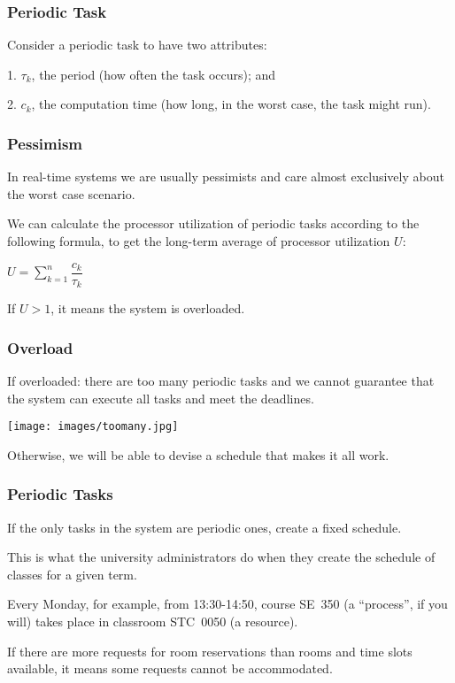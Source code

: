 \begin{frame}
\frametitle{Periodic Task}

Consider a periodic task to have two attributes: 

1. $\tau_{k}$, the period (how often the task occurs); and 

2. $c_{k}$, the computation time (how long, in the worst case, the task might run).

\end{frame}

\begin{frame}
\frametitle{Pessimism}

In real-time systems we are usually pessimists and care almost exclusively about the worst case scenario. 

We can calculate the processor utilization of periodic tasks according to the following formula, to get the long-term average of processor utilization $U$:

\begin{center}
$U = \sum\limits_{k=1}^n\dfrac{c_{k}}{\tau_{k}}$
\end{center}

If $U > 1$, it means the system is overloaded. 

\end{frame}

\begin{frame}
\frametitle{Overload}
If overloaded: there are too many periodic tasks and we cannot guarantee that the system can execute all tasks and meet the deadlines. 

\begin{center}
	\texttt{[image: images/toomany.jpg]}
\end{center}

Otherwise, we will be able to devise a schedule that makes it all work.

\end{frame}

\begin{frame}
\frametitle{Periodic Tasks}

If the only tasks in the system are periodic ones, create a fixed schedule. 

This is what the university administrators do when they create the schedule of classes for a given term.

 Every Monday, for example, from 13:30-14:50, course SE~350 (a ``process'', if you will) takes place in classroom STC~0050 (a resource). 
 
If there are more requests for room reservations than rooms and time slots available, it means some requests cannot be accommodated.

\end{frame}

